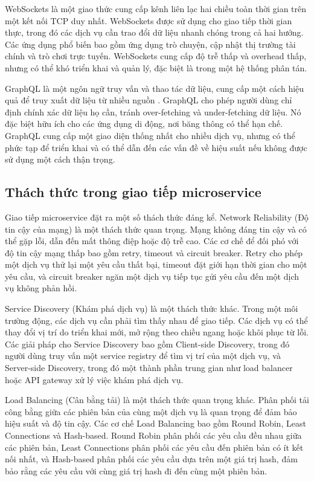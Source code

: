 WebSockets là một giao thức cung cấp kênh liên lạc hai chiều toàn thời gian
trên một kết nối TCP duy nhất. WebSockets được sử dụng cho giao tiếp thời gian
thực, trong đó các dịch vụ cần trao đổi dữ liệu nhanh chóng trong cả hai hướng.
Các ứng dụng phổ biến bao gồm ứng dụng trò chuyện, cập nhật thị trường tài
chính và trò chơi trực tuyến. WebSockets cung cấp độ trễ thấp và overhead thấp,
nhưng có thể khó triển khai và quản lý, đặc biệt là trong một hệ thống phân
tán.

GraphQL là một ngôn ngữ truy vấn và thao tác dữ liệu, cung cấp một cách hiệu
quả để truy xuất dữ liệu từ nhiều nguồn \cite{richardson2019}. GraphQL cho phép người dùng chỉ định
chính xác dữ liệu họ cần, tránh over-fetching và under-fetching dữ liệu. Nó đặc
biệt hữu ích cho các ứng dụng di động, nơi băng thông có thể hạn chế. GraphQL
cung cấp một giao diện thống nhất cho nhiều dịch vụ, nhưng có thể phức tạp để
triển khai và có thể dẫn đến các vấn đề về hiệu suất nếu không được sử dụng một
cách thận trọng.

\subsection{Thách thức trong giao tiếp microservice}
Giao tiếp microservice đặt ra một số thách thức đáng kể. Network Reliability
(Độ tin cậy của mạng) là một thách thức quan trọng. Mạng không đáng tin cậy và
có thể gặp lỗi, dẫn đến mất thông điệp hoặc độ trễ cao. Các cơ chế để đối phó
với độ tin cậy mạng thấp bao gồm retry, timeout và circuit breaker. Retry cho
phép một dịch vụ thử lại một yêu cầu thất bại, timeout đặt giới hạn thời gian
cho một yêu cầu, và circuit breaker ngăn một dịch vụ tiếp tục gửi yêu cầu đến
một dịch vụ không phản hồi.

Service Discovery (Khám phá dịch vụ) là một thách thức khác. Trong một môi
trường động, các dịch vụ cần phải tìm thấy nhau để giao tiếp. Các dịch vụ có
thể thay đổi vị trí do triển khai mới, mở rộng theo chiều ngang hoặc khôi phục
từ lỗi. Các giải pháp cho Service Discovery bao gồm Client-side Discovery,
trong đó người dùng truy vấn một service registry để tìm vị trí của một dịch
vụ, và Server-side Discovery, trong đó một thành phần trung gian như load
balancer hoặc API gateway xử lý việc khám phá dịch vụ.

Load Balancing (Cân bằng tải) là một thách thức quan trọng khác. Phân phối tải
công bằng giữa các phiên bản của cùng một dịch vụ là quan trọng để đảm bảo hiệu
suất và độ tin cậy. Các cơ chế Load Balancing bao gồm Round Robin, Least
Connections và Hash-based. Round Robin phân phối các yêu cầu đều nhau giữa các
phiên bản, Least Connections phân phối các yêu cầu đến phiên bản có ít kết nối
nhất, và Hash-based phân phối các yêu cầu dựa trên một giá trị hash, đảm bảo
rằng các yêu cầu với cùng giá trị hash đi đến cùng một phiên bản.


